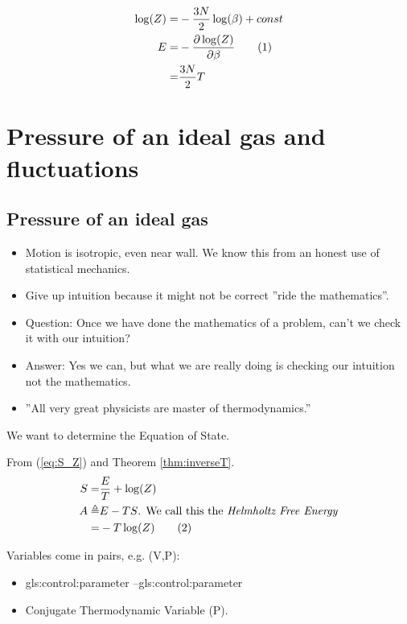 \documentclass[]{article}
\newcommand\numberthis{\addtocounter{equation}{1}\tag{\theequation}}
\begin{document}
\begin{align*}
\log(Z) =& - \frac{3N}{2} \log(\beta) + const\\
E =& - \frac{\partial \log(Z)}{\partial \beta}\numberthis \label{eq:E:Z}\\
=& \frac{3N}{2} T
\end{align*}


\section{Pressure of an ideal gas and fluctuations}

\subsection{Pressure of an ideal gas}

\begin{itemize}
	\item Motion is isotropic, even near wall. We know this from an honest use of statistical mechanics.
	\item Give up intuition because it might not be correct ''ride the mathematics''.
	\item Question: Once we have done the mathematics of a problem, can’t we check it with our intuition?
	\item Answer: Yes we can, but what we are really doing is checking our intuition not the mathematics.
	\item ''All very great physicists are master of thermodynamics.''
\end{itemize}

We want to determine the Equation of State.

From (\ref{eq:S_Z}) and Theorem \ref{thm:inverseT}.
\begin{align*}
S =& \frac{E}{T} + \log(Z)\\
A\triangleq &E - TS\text{. We call this the \emph{Helmholtz Free Energy}} \\
=& -T \log(Z) \numberthis \label{eq:helmholtz}
\end{align*}

Variables come in pairs, e.g. (V,P):
\begin{itemize}
	\item \Gls{gls:control:parameter} --\glsdesc{gls:control:parameter} 
	\item Conjugate Thermodynamic Variable (P).
\end{itemize}
\end{document}
